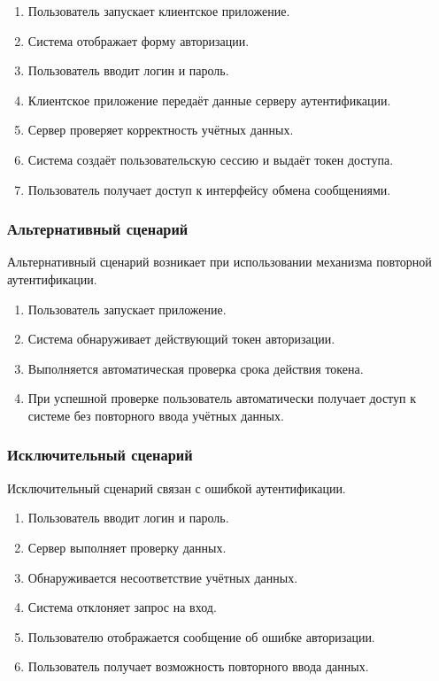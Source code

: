 \begin{enumerate}
    \item Пользователь запускает клиентское приложение.
    \item Система отображает форму авторизации.
    \item Пользователь вводит логин и пароль.
    \item Клиентское приложение передаёт данные серверу аутентификации.
    \item Сервер проверяет корректность учётных данных.
    \item Система создаёт пользовательскую сессию и выдаёт токен доступа.
    \item Пользователь получает доступ к интерфейсу обмена сообщениями.
\end{enumerate}

\subsubsection{Альтернативный сценарий}

Альтернативный сценарий возникает при использовании механизма повторной аутентификации.

\begin{enumerate}
    \item Пользователь запускает приложение.
    \item Система обнаруживает действующий токен авторизации.
    \item Выполняется автоматическая проверка срока действия токена.
    \item При успешной проверке пользователь автоматически получает доступ к системе без повторного ввода учётных данных.
\end{enumerate}

\subsubsection{Исключительный сценарий}

Исключительный сценарий связан с ошибкой аутентификации.

\begin{enumerate}
    \item Пользователь вводит логин и пароль.
    \item Сервер выполняет проверку данных.
    \item Обнаруживается несоответствие учётных данных.
    \item Система отклоняет запрос на вход.
    \item Пользователю отображается сообщение об ошибке авторизации.
    \item Пользователь получает возможность повторного ввода данных.
\end{enumerate}

